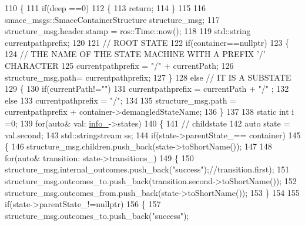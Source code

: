 \begin{DoxyCode}
110     \{
111         \textcolor{keywordflow}{if}(deep ==0)
112         \{
113             \textcolor{keywordflow}{return};
114         \}
115 
116         smacc\_msgs::SmaccContainerStructure structure\_msg;
117         structure\_msg.header.stamp = ros::Time::now();
118 
119         std::string currentpathprefix;
120         
121         \textcolor{comment}{// ROOT STATE}
122         \textcolor{keywordflow}{if}(container==\textcolor{keyword}{nullptr})
123         \{
124             \textcolor{comment}{// THE NAME OF THE STATE MACHINE WITH A PREFIX '/' CHARACTER}
125             currentpathprefix = \textcolor{stringliteral}{"/"} + currentPath;
126             structure\_msg.path= currentpathprefix;
127         \}
128         \textcolor{keywordflow}{else} \textcolor{comment}{// IT IS A SUBSTATE}
129         \{
130             \textcolor{keywordflow}{if}(currentPath!=\textcolor{stringliteral}{""})
131                 currentpathprefix = currentPath + \textcolor{stringliteral}{"/"}  ;
132             \textcolor{keywordflow}{else}
133                 currentpathprefix = \textcolor{stringliteral}{"/"};
134 
135             structure\_msg.path = currentpathprefix + container->demangledStateName;
136         \}
137 
138         \textcolor{keyword}{static} \textcolor{keywordtype}{int} i =0;
139         \textcolor{keywordflow}{for}(\textcolor{keyword}{auto}& val: \hyperlink{classsmacc_1_1ISmaccStateMachine_a5ec3201cbddab4f062f572fb33021041}{info\_}->states)
140         \{
141             \textcolor{comment}{// childstate}
142             \textcolor{keyword}{auto} state = val.second;
143             std::stringstream ss;
144             \textcolor{keywordflow}{if}(state->parentState\_== container)
145             \{
146                 structure\_msg.children.push\_back(state->toShortName());    
147 
148                 \textcolor{keywordflow}{for}(\textcolor{keyword}{auto}& transition: state->transitions\_)
149                 \{
150                     structure\_msg.internal\_outcomes.push\_back(\textcolor{stringliteral}{"success"});\textcolor{comment}{//transition.first);  }
151                     structure\_msg.outcomes\_to.push\_back(transition.second->toShortName());
152                     structure\_msg.outcomes\_from.push\_back(state->toShortName());
153                 \}
154 
155                 \textcolor{keywordflow}{if}(state->parentState\_!=\textcolor{keyword}{nullptr})
156                 \{
157                     structure\_msg.outcomes\_to.push\_back(\textcolor{stringliteral}{"success"});

\end{DoxyCode}
